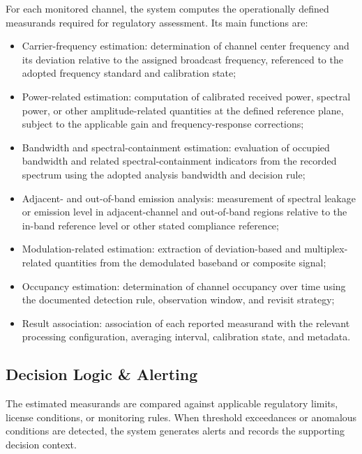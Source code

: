 \documentclass[11pt]{article}
\begin{document}
For each monitored channel, the system computes the operationally defined measurands required for regulatory assessment. Its main functions are:
\begin{itemize}
    \item Carrier-frequency estimation: determination of channel center frequency and its deviation relative to the assigned broadcast frequency, referenced to the adopted frequency standard and calibration state;
    \item Power-related estimation: computation of calibrated received power, spectral power, or other amplitude-related quantities at the defined reference plane, subject to the applicable gain and frequency-response corrections;
    \item Bandwidth and spectral-containment estimation: evaluation of occupied bandwidth and related spectral-containment indicators from the recorded spectrum using the adopted analysis bandwidth and decision rule;
    \item Adjacent- and out-of-band emission analysis: measurement of spectral leakage or emission level in adjacent-channel and out-of-band regions relative to the in-band reference level or other stated compliance reference;
    \item Modulation-related estimation: extraction of deviation-based and multiplex-related quantities from the demodulated baseband or composite signal;
    \item Occupancy estimation: determination of channel occupancy over time using the documented detection rule, observation window, and revisit strategy;
    \item Result association: association of each reported measurand with the relevant processing configuration, averaging interval, calibration state, and metadata.
\end{itemize}

\subsection*{Decision Logic \& Alerting}

The estimated measurands are compared against applicable regulatory limits, license conditions, or monitoring rules. When threshold exceedances or anomalous conditions are detected, the system generates alerts and records the supporting decision context.
\end{document}
